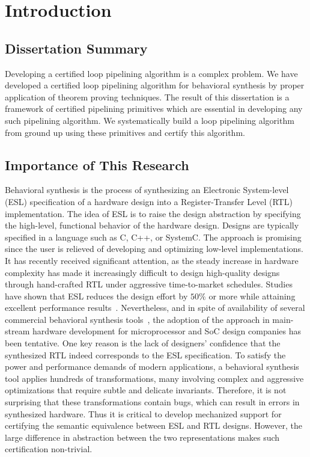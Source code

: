 \chapter{Introduction}
\label{sec:dissertation-thesis}

\section {Dissertation Summary}
Developing a certified loop pipelining algorithm is a complex problem.
We have developed a certified loop pipelining algorithm for behavioral 
synthesis by proper application of theorem proving techniques.
The result of this dissertation is a framework of certified pipelining primitives 
which are essential in developing any such pipelining algorithm. We systematically
build a loop pipelining algorithm from ground up using these primitives and certify this algorithm.

\section {Importance of This Research}
Behavioral synthesis is the process of synthesizing an
Electronic System-level (ESL) specification of a hardware
design into a Register-Transfer Level (RTL) implementation.
The idea of ESL is to raise the design abstraction by specifying the high-level,
functional behavior of the hardware design. Designs are
typically specified in a language such as C, C++, or SystemC.
The approach is promising since the user is relieved of
developing and optimizing low-level implementations. 
It has recently received significant attention, as the steady 
increase in hardware complexity has made it increasingly 
difficult to design high-quality designs through hand-crafted RTL under aggressive
time-to-market schedules. Studies have shown that ESL
reduces the design effort by $50\%$ or more while attaining
excellent performance results~\cite{Moussa99}.
Nevertheless, and in spite of availability of several
commercial behavioral synthesis tools~\cite{ctos,forte,vivado},
the adoption of the approach in main-stream hardware development for
microprocessor and SoC design companies has been tentative.
One key reason is the lack of designers' confidence that
the synthesized RTL indeed corresponds to the ESL
specification. To satisfy the power and performance demands
of modern applications, a behavioral synthesis tool applies
hundreds of transformations, many involving complex and
aggressive optimizations that require subtle and delicate
invariants. Therefore, it is not surprising that these transformations
contain bugs, which can result in errors in synthesized
hardware.  Thus it is critical to develop mechanized support
for certifying the semantic equivalence between ESL and RTL
designs. However, the large difference in
abstraction between the two representations makes such
certification non-trivial.

